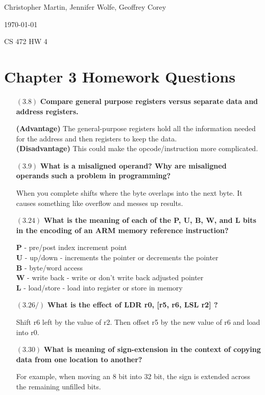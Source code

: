 \documentclass[letterpaper,10pt,titlepage]{article}
\def\name{Christopher Martin, Jennifer Wolfe, Geoffrey Corey}
\begin{document}
\hfill \name

\hfill \today

\hfill CS 472 HW 4

\section*{Chapter 3 Homework Questions}


\begin{enumerate}
\item[$(3.8)$] \textbf{Compare general purpose registers versus separate data and address registers.}

\textbf{(Advantage)} The general-purpose registers hold all the information needed for the address and then registers to keep the data.\\
\textbf{(Disadvantage)} This could make the opcode/instruction more complicated.

\item[$(3.9)$] \textbf{What is a misaligned operand? Why are misaligned operands such a problem in programming?}

When you complete shifts where the byte overlaps into the next byte. It causes something like overflow and messes up results.

\item[$(3.24)$] \textbf{What is the meaning of each of the P, U, B, W, and L bits in the encoding of an ARM memory reference instruction?}

\textbf{P} - pre/post index increment point\\
\textbf{U} - up/down - increments the pointer or decrements the pointer\\
\textbf{B} - byte/word access\\
\textbf{W} - write back - write or don't write back adjusted pointer\\
\textbf{L} - load/store - load into register or store in memory\\

\item[$(3.26/)$] \textbf{What is the effect of LDR r0, [r5, r6, LSL r2] ?}

Shift r6 left by the value of r2. Then offset r5 by the new value of r6 and load into r0.

\item[$(3.30)$] \textbf{What is meaning of sign-extension in the context of copying data from one location to another?}
 
For example, when moving an 8 bit into 32 bit, the sign is extended across the remaining unfilled bits.


\end{enumerate}
\end{document}
